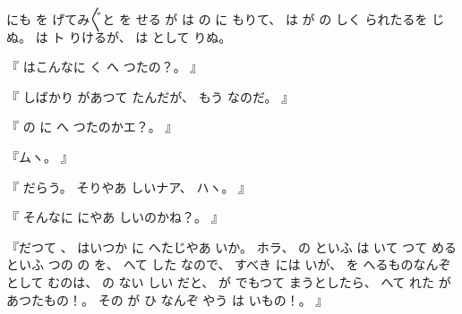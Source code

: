 %
にも
を
げてみ〴〵と
を
せる
が
は
の
に
もりて、
%
は
が
の
しく
られたるを
じぬ。
%
は
ト
りけるが、
%
は
として
りぬ。

%
『
はこんなに
く
へ
つたの？。
』

%
『
しばかり
があつて
たんだが、
%
もう
なのだ。
』

%
『
の
に
へ%
つたのかエ？。
』

%
『ムヽ。
』

%
『
だらう。
%
そりやあ
しいナア、
%
ハヽ。
』

%
『
そんなに
にやあ
しいのかね？。
』

%
『だつて
、
%
はいつか
に
へたじやあ
いか。
%
ホラ、
%
の
といふ%
は
いて
つて
めるといふ
つの
の
を、
%
へて
した
なので、
%
すべき
には
いが、
%
を
へるものなんぞとして
むのは、
%
の
ない
しい
だと、
%
が
でもつて
まうとしたら、
%
へて
れた
があつたもの！。
%
その
が
ひ
なんぞ
やう
は
いもの！。
』

